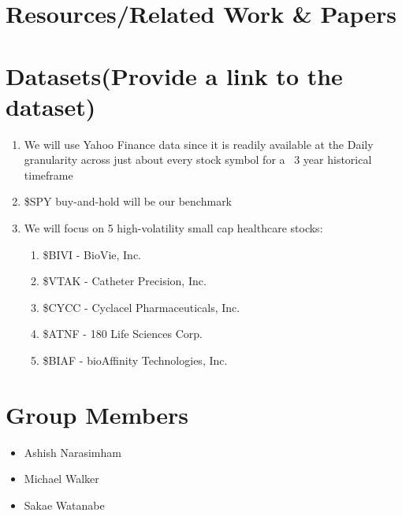 \documentclass[
	letterpaper, %
]{jdf}
\begin{document}
\section*{Resources/Related Work \& Papers}

\printbibliography[heading=none]

\section*{Datasets(Provide a link to the dataset)}

\begin{enumerate}
    \item We will use Yahoo Finance data since it is readily available at the Daily granularity across just about every stock symbol for a ~3 year historical timeframe
    \item \$SPY buy-and-hold will be our benchmark
    \item We will focus on 5 high-volatility small cap healthcare stocks:
    \begin{enumerate}
        \item \$BIVI - BioVie, Inc.
        \item \$VTAK - Catheter Precision, Inc.
        \item \$CYCC - Cyclacel Pharmaceuticals, Inc.
        \item \$ATNF - 180 Life Sciences Corp.
        \item \$BIAF - bioAffinity Technologies, Inc.
    \end{enumerate}
\end{enumerate}


\section*{Group Members}

\begin{itemize}
	\item Ashish Narasimham
	\item Michael Walker
	\item Sakae Watanabe
\end{itemize}
\end{document}
